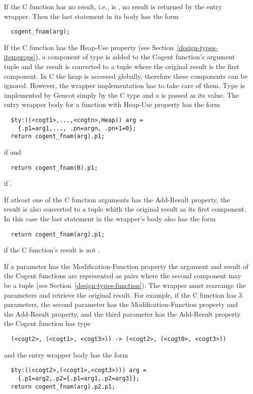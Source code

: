 If the C function has no result, i.e.,  is , no result is returned by the entry
wrapper. Then the last statement in its body has the form
\begin{verbatim}
  cogent_fnam(arg);
\end{verbatim}

If the C function has the Heap-Use property (see Section~\ref{design-types-itemprops}), a component of type
 is added to the Cogent function's argument tuple and the result is converted to a tuple where the
original result is the first component. In C the heap is accessed globally, therefore these components can 
be ignored. However, the wrapper implementation has to take care of them. Type  is implemented by
Gencot simply by the C type  and a  is passed as its value. The entry wrapper body for a
function with Heap-Use property has the form
\begin{verbatim}
  $ty:((<cogt1>,...,<cogtn>,Heap)) arg = 
    {.p1=arg1,..., .pn=argn, .pn+1=0};
  return cogent_fnam(arg).p1;
\end{verbatim}
if  and
\begin{verbatim}
  return cogent_fnam(0).p1;
\end{verbatim}
if .

If atleast one of the C function arguments has the Add-Result property, the result is also converted to a tuple 
whith the original result as its first component. In this case the last statement in the wrapper's body also 
has the form
\begin{verbatim}
  return cogent_fnam(arg).p1;
\end{verbatim}
if the C function's result is not .

If a parameter has the Modification-Function property the argument and result of the Cogent functions are
represented as pairs where the second component may be a tuple (see Section~\ref{design-types-function}). 
The wrapper must rearrange the parameters and retrieve the original result. For example, if the C 
function has 3 parameters, the second parameter has the Modification-Function property and the Add-Result 
property, and the third parameter has the Add-Result property the Cogent function has type
\begin{verbatim}
  (<cogt2>, (<cogt1>, <cogt3>)) -> (<cogt2>, (<cogt0>, <cogt3>))
\end{verbatim}
and the entry wrapper body has the form
\begin{verbatim}
  $ty:((<cogt2>,(<cogt1>,<cogt3>))) arg = 
    {.p1=arg2,.p2={.p1=arg1,.p2=arg3}};
  return cogent_fnam(arg).p2.p1;
\end{verbatim}

